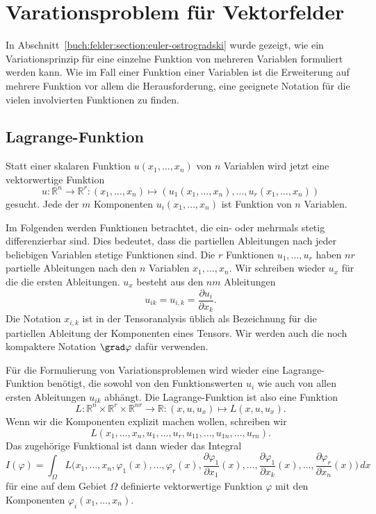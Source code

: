 %
%
%
\section{Varationsproblem für Vektorfelder
\label{buch:felder:section:vektorfelder}}
In Abschnitt~\ref{buch:felder:section:euler-ostrogradski} wurde gezeigt,
wie ein Variationsprinzip für eine einzelne Funktion von mehreren Variablen
formuliert werden kann.
Wie im Fall einer Funktion einer Variablen ist die Erweiterung auf
mehrere Funktion vor allem die Herausforderung, eine geeignete Notation
für die vielen involvierten Funktionen zu finden.

%
%
\subsection{Lagrange-Funktion
\label{buch:felder:vektorfeilder:subsetion:lagrange-funktion}}
Statt einer skalaren Funktion $u(x_1,\dots,x_n)$ von $n$ Variablen
wird jetzt eine vektorwertige Funktion
\[
u
\colon
\mathbb{R}^n \to \mathbb{R}^r
:
(x_1,\dots,x_n)
\mapsto
(
u_1(x_1,\dots,x_n)
,\dots,
u_r(x_1,\dots,x_n)
)
\]
gesucht.
Jede der $m$ Komponenten $u_i(x_1,\dots,x_n)$ ist Funktion von
$n$ Variablen.

Im Folgenden werden Funktionen betrachtet, die ein- oder mehrmals
stetig differenzierbar sind.
Dies bedeutet, dass die partiellen Ableitungen nach jeder beliebigen
Variablen stetige Funktionen sind.
Die $r$ Funktionen $u_1,\dots,u_r$ haben $nr$ partielle Ableitungen
nach den $n$ Variablen $x_1,\dots,x_n$.
Wir schreiben wieder $u_x$ für die die ersten Ableitungen.
$u_x$ besteht aus den $nm$ Ableitungen 
\[
u_{ik}
=
u_{i,k}
=
\frac{\partial u_i}{\partial x_k}.
\]
Die Notation $x_{i,k}$ ist in der Tensoranalysis üblich als Bezeichnung
für die partiellen Ableitung der Komponenten eines Tensors.
Wir werden auch die noch kompaktere Notation $\grad\varphi$ dafür 
verwenden.

Für die Formulierung von Variationsproblemen wird wieder eine
Lagrange-Funktion benötigt, die sowohl von den Funktionswerten
$u_i$ wie auch von allen ersten Ableitungen $u_{ik}$ abhängt.
Die Lagrange-Funktion ist also eine Funktion
\begin{equation*}
L
\colon
\mathbb{R}^n\times \mathbb{R}^r \times \mathbb{R}^{nr}\to\mathbb{R}
:
(x,u,u_x)
\mapsto
L(x,u,u_x).
\end{equation*}
Wenn wir die Komponenten explizit machen wollen, schreiben wir
\[
L(x_1,\dots,x_n,u_1,\dots,u_r,u_{11},\dots,u_{1n},\dots,u_{rn}).
\]
Das zugehörige Funktional ist dann wieder das Integral
\begin{equation}
I(\varphi)
=
\int_{\Omega}
L\biggl(x_1,\dots,x_n,
\varphi_1(x),\dots,\varphi_r(x),
\frac{\partial\varphi_1}{\partial x_1}(x),
\dots,
\frac{\partial\varphi_1}{\partial x_k}(x),
\dots,
\frac{\partial\varphi_r}{\partial x_n}(x)
\biggr)
\,dx
\label{buch:felder:vektorfelder:eqn:lagrange-funktional}
\end{equation}
für eine auf dem Gebiet $\Omega$ definierte vektorwertige Funktion
$\varphi$ mit den Komponenten $\varphi_i(x_1,\dots,x_n)$.

